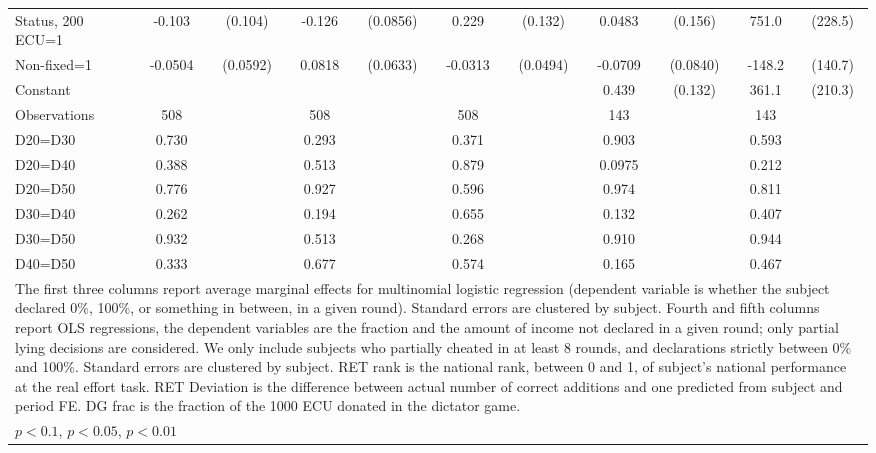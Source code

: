 \begin{tabular}{l|cccccc|cc|cc}
Status, 200 ECU=1&   -0.103         &  (0.104)&   -0.126         & (0.0856)&    0.229\sym{*}  &  (0.132)&   0.0483         &  (0.156)&    751.0\sym{***}&  (228.5)\\
Non-fixed=1     &  -0.0504         & (0.0592)&   0.0818         & (0.0633)&  -0.0313         & (0.0494)&  -0.0709         & (0.0840)&   -148.2         &  (140.7)\\
Constant        &                  &         &                  &         &                  &         &    0.439\sym{***}&  (0.132)&    361.1\sym{*}  &  (210.3)\\
\hline
Observations    &      508         &         &      508         &         &      508         &         &      143         &         &      143         &         \\
D20=D30         &    0.730         &         &    0.293         &         &    0.371         &         &    0.903         &         &    0.593         &         \\
D20=D40         &    0.388         &         &    0.513         &         &    0.879         &         &   0.0975         &         &    0.212         &         \\
D20=D50         &    0.776         &         &    0.927         &         &    0.596         &         &    0.974         &         &    0.811         &         \\
D30=D40         &    0.262         &         &    0.194         &         &    0.655         &         &    0.132         &         &    0.407         &         \\
D30=D50         &    0.932         &         &    0.513         &         &    0.268         &         &    0.910         &         &    0.944         &         \\
D40=D50         &    0.333         &         &    0.677         &         &    0.574         &         &    0.165         &         &    0.467         &         \\
\hline\hline
\multicolumn{11}{p{18cm}}{\tiny The first three columns report average marginal effects for multinomial logistic regression (dependent variable is whether the subject declared 0\%, 100\%, or something in between, in a given round). Standard errors are clustered by subject. Fourth and fifth columns report OLS regressions, the dependent variables are the fraction and the amount of income not declared in a given round; only partial lying decisions are considered. We only include subjects who partially cheated in at least 8 rounds, and declarations strictly between 0\% and 100\%. Standard errors are clustered by subject. RET rank is the national rank, between 0 and 1, of subject's national performance at the real effort task. RET Deviation is the difference between actual number of correct additions and one predicted from subject and period FE. DG frac is the fraction of the 1000 ECU donated in the dictator game.}\\
\multicolumn{11}{l}{\tiny \sym{*} \(p<0.1\), \sym{**} \(p<0.05\), \sym{***} \(p<0.01\)}\\
\end{tabular}